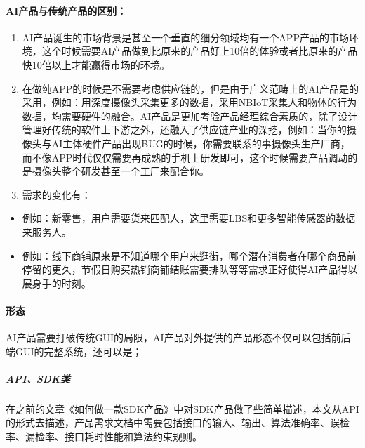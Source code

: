 \documentclass[letterpaper,11pt,english]{sphinxmanual}
\begin{document}
\paragraph{AI产品与传统产品的区别：}
\label{\detokenize{chapter_introduction/AI_Product:id2}}\begin{enumerate}
%
\item {} 
AI产品诞生的市场背景是甚至一个垂直的细分领域均有一个APP产品的市场环境，这个时候需要AI产品做到比原来的产品好上10倍的体验或者比原来的产品快10倍以上才能赢得市场的环境。

\item {} 
在做纯APP的时候是不需要考虑供应链的，但是由于广义范畴上的AI产品是的采用，例如：用深度摄像头采集更多的数据，采用NB\sphinxhyphen{}IoT采集人和物体的行为数据，均需要硬件的融合。AI产品是更加考验产品经理综合素质的，除了设计管理好传统的软件上下游之外，还融入了供应链产业的深挖，例如：当你的摄像头与AI主体硬件产品出现BUG的时候，你需要联系的事摄像头生产厂商，而不像APP时代仅仅需要再成熟的手机上研发即可，这个时候需要产品调动的是摄像头整个研发甚至一个工厂来配合你。

\item {} 
需求的变化有：

\end{enumerate}
\begin{itemize}
\item {} 
例如：新零售，用户需要货来匹配人，这里需要LBS和更多智能传感器的数据来服务人。

\item {} 
例如：线下商铺原来是不知道哪个用户来逛街，哪个潜在消费者在哪个商品前停留的更久，节假日购买热销商铺结账需要排队等等需求正好使得AI产品得以展身手的时刻。

\end{itemize}


\paragraph{形态}
\label{\detokenize{chapter_introduction/AI_Product:id3}}
AI产品需要打破传统GUI的局限，AI产品对外提供的产品形态不仅可以包括前后端GUI的完整系统，还可以是；


\subparagraph{API、SDK类}
\label{\detokenize{chapter_introduction/AI_Product:apisdk}}
在之前的文章《如何做一款SDK产品》中对SDK产品做了些简单描述，本文从API的形式去描述，产品需求文档中需要包括接口的输入、输出、算法准确率、误检率、漏检率、接口耗时性能和算法约束规则。
\end{document}
